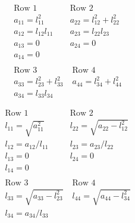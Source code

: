 \documentclass{report}
\begin{document}
\begin{equation}
  \begin{array}{ll}
    \mbox{Row 1}         & \mbox{Row 2}                             \\
    a_{11} = l_{11}^2      & a_{22} = l_{12}^2      + l_{22}^2      \\
    a_{12} = l_{12} l_{11} & a_{23} = l_{22} l_{23}                 \\
    a_{13} = 0             & a_{24} = 0                             \\
    a_{14} = 0             &                                        \\ 
                           &                                        \\
    \mbox{Row 3}               & \; \mbox{Row 4}                    \\
    a_{33} = l_{23}^2 + l_{33}^2 & \; a_{44} = l_{34}^2 + l_{44}^2  \\
    a_{34} = l_{33} l_{34}       & \; 
  \end{array}
\end{equation}

\begin{equation}
  \begin{array}{ll}
    \mbox{Row 1}           & \mbox{Row 2}                        \\
    l_{11} = \sqrt{a_{11}^2} & l_{22} = \sqrt{a_{22} - l_{12}^2} \\
    l_{12} = a_{12} / l_{11} & l_{23} = a_{23}/l_{22}            \\
    l_{13} = 0               & l_{24} = 0                        \\
    l_{14} = 0               &                                   \\ 
                             &                                   \\
    \mbox{Row 3}                      & \; \mbox{Row 4}                      \\
    l_{33} = \sqrt{a_{33} - l_{23}^2} & \; l_{44} = \sqrt{a_{44} - l_{34}^2} \\
    l_{34} = a_{34}/l_{33}            & \; 
  \end{array}
\end{equation}

\clearpage

\end{document}
